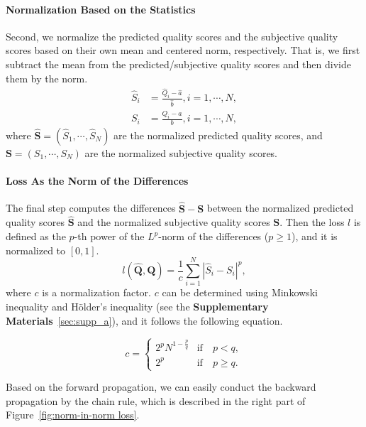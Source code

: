 \documentclass[sigconf]{acmart}
\begin{document}
\paragraph{Normalization Based on the Statistics}
Second, we normalize the predicted quality scores and the subjective quality scores based on their own mean and centered norm, respectively. That is, we first subtract the mean from the predicted/subjective quality scores and then divide them by the norm. 
\begin{align}
\hat{S}_i &= \frac{\hat{Q}_i-\hat{a}}{\hat{b}}, i=1,\cdots,N, \label{eq:normalization1}\\
{S}_i &= \frac{{Q}_i-{a}}{{b}}, i=1,\cdots,N,\label{eq:normalization2} 
\end{align}
where $\hat{\mathbf{S}}=(\hat{S}_1,\cdots,\hat{S}_N)$ are the normalized predicted quality scores, and ${\mathbf{S}}= ({S}_1,\cdots,{S}_N)$ are the normalized subjective quality scores.

\paragraph{Loss As the Norm of the Differences}
The final step computes the differences $\hat{\mathbf{S}}-{\mathbf{S}}$ between the normalized predicted quality scores $\hat{\mathbf{S}}$ and the normalized subjective quality scores ${\mathbf{S}}$.
Then the loss $l$ is defined as the $p$-th power of the $L^p$-norm of the differences ($p\ge 1$), and it is normalized to $[0, 1]$.
\begin{equation}
    l(\hat{\mathbf{Q}}, \mathbf{Q}) = \frac{1}{c}\sum_{i=1}^{N} {|\hat{S}_{i}-{S}_{i}|}^{p}, 
\end{equation}
where $c$ is a normalization factor. $c$ can be determined using Minkowski inequality and H\"older's inequality (see the \textbf{Supplementary Materials}~\ref{sec:supp_a}), and it follows the following equation.

\begin{equation}\label{eq:factor}
c = 
\begin{cases}
    2^pN^{1-\frac{p}{q}} & \mbox{if}\quad p<q, \\
    2^p & \mbox{if}\quad p\ge q.
\end{cases}
\end{equation}

Based on the forward propagation, we can easily conduct the backward propagation by the chain rule, which is described in the right part of Figure~\ref{fig:norm-in-norm loss}.
\end{document}
